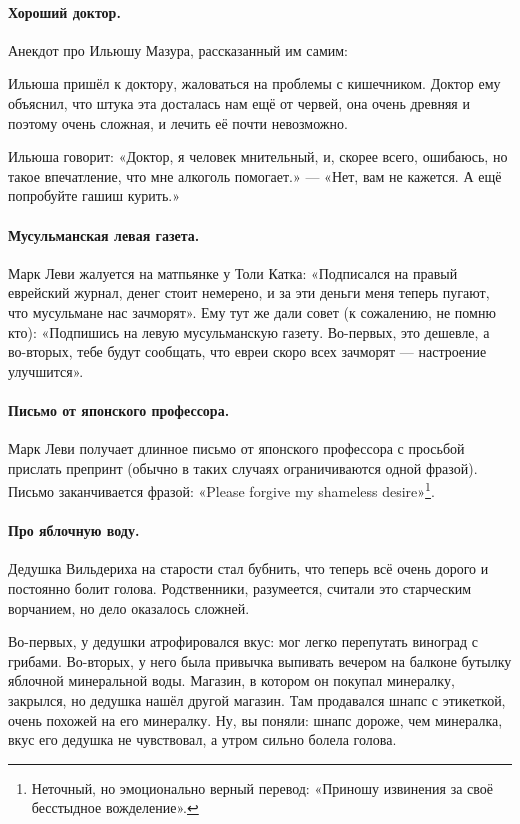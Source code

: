 \documentclass{book}
\begin{document}
\paragraph{Хороший доктор.}
Анекдот про Ильюшу Мазура, рассказанный им самим:

Ильюша пришёл к доктору, жаловаться на проблемы с кишечником.
Доктор ему объяснил, что штука эта досталась нам ещё от червей, она очень древняя и поэтому очень сложная, и лечить её почти невозможно.

Ильюша говорит: «Доктор, я человек мнительный, и, скорее всего, ошибаюсь, но такое впечатление, что мне алкоголь помогает.» --- «Нет, вам не кажется. А ещё попробуйте гашиш курить.»


\paragraph{Мусульманская левая газета.}
Марк Леви жалуется на матпьянке у Толи Катка: «Подписался на правый еврейский журнал, денег стоит немерено, и за эти деньги меня теперь пугают, что мусульмане нас зачморят».
Ему тут же дали совет (к сожалению, не помню кто):
«Подпишись на левую мусульманскую газету. 
Во-первых, это дешевле, а во-вторых, тебе будут сообщать, что евреи скоро всех зачморят --- настроение улучшится».

\paragraph{Письмо от японского профессора.}
Марк Леви получает длинное письмо от японского профессора с просьбой прислать препринт (обычно в таких случаях ограничиваются одной фразой).
Письмо заканчивается фразой: «Please forgive my shameless desire»\footnote{Неточный, но эмоционально верный перевод: «Приношу извинения за своё бесстыдное вожделение».}.

\paragraph{Про яблочную воду.}
Дедушка Вильдериха на старости стал бубнить, что теперь всё очень дорого и постоянно болит голова.
Родственники, разумеется, считали это старческим ворчанием, но дело оказалось сложней.

Во-первых, у дедушки атрофировался вкус: мог легко перепутать виноград с грибами.
Во-вторых, у него была привычка выпивать вечером на балконе бутылку яблочной минеральной воды.
Магазин, в котором он покупал минералку, закрылся, но дедушка нашёл другой магазин.
Там продавался шнапс с этикеткой, очень похожей на его минералку.
Ну, вы поняли: шнапс дороже, чем минералка, вкус его дедушка не чувствовал, а утром сильно болела голова.
\end{document}
